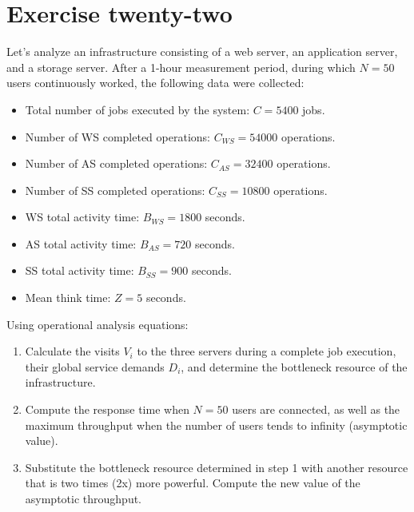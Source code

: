 \section{Exercise twenty-two}

Let's analyze an infrastructure consisting of a web server, an application server, and a storage server. 
After a 1-hour measurement period, during which $N = 50$ users continuously worked, the following data were collected:
\begin{itemize}
    \item Total number of jobs executed by the system: $C = 5400$ jobs.
    \item Number of WS completed operations: $C_{WS} = 54000$ operations.
    \item Number of AS completed operations: $C_{AS} = 32400$ operations.
    \item Number of SS completed operations: $C_{SS} = 10800$ operations.
    \item WS total activity time: $B_{WS} = 1800$ seconds.
    \item AS total activity time: $B_{AS} = 720$ seconds.
    \item SS total activity time: $B_{SS} = 900$ seconds.
    \item Mean think time: $Z = 5$ seconds.
\end{itemize}
Using operational analysis equations:
\begin{enumerate}
\item Calculate the visits $V_i$ to the three servers during a complete job execution, their global service demands $D_i$, and determine the bottleneck resource of the infrastructure.
\item Compute the response time when $N = 50$ users are connected, as well as the maximum throughput when the number of users tends to infinity (asymptotic value).
\item Substitute the bottleneck resource determined in step 1 with another resource that is two times (2x) more powerful. 
    Compute the new value of the asymptotic throughput.
\end{enumerate}

